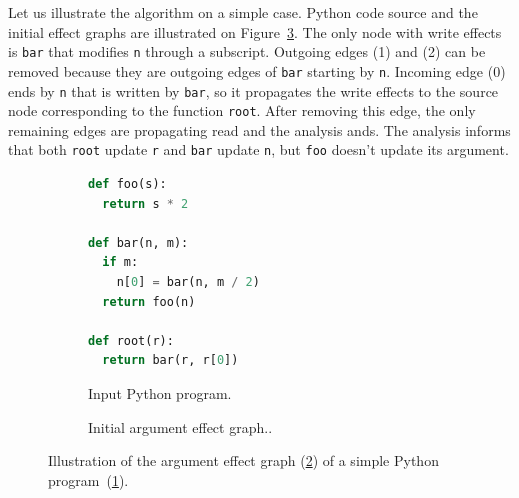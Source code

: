 \documentclass[10pt, preprint]{sigplanconf}
\begin{document}
Let us illustrate the algorithm on a simple case. Python code source and the
initial effect graphs are illustrated on Figure~\ref{fig:argument-effects}. The
only node with write effects is \texttt{bar} that modifies \texttt{n} through a
subscript. Outgoing edges (1) and (2) can be removed because they are
outgoing edges of \texttt{bar} starting by \texttt{n}. Incoming edge (0) ends
by \texttt{n} that is written by \texttt{bar}, so it propagates the write 
effects to the source node corresponding to the function \texttt{root}. After
removing this edge, the only remaining edges are propagating read and the 
analysis ands. The analysis informs that both \texttt{root} update \texttt{r} 
and \texttt{bar} update \texttt{n}, but \texttt{foo} doesn't update its 
argument.

\begin{figure}

    \begin{subfigure}{.5\textwidth}
        \begin{lstlisting}[language=python]
def foo(s):
  return s * 2

def bar(n, m):
  if m:
    n[0] = bar(n, m / 2)
  return foo(n)

def root(r):
  return bar(r, r[0])
        \end{lstlisting}
        \caption{Input Python program.}
        \label{fig:argument-effects-code}
    \end{subfigure}

    \begin{subfigure}{.5\textwidth}
        \centering
        \caption{Initial argument effect graph..}
        \label{fig:argument-effects-graph}
    \end{subfigure}

    \caption{Illustration of the argument effect graph (\ref{fig:argument-effects-graph}) of a simple Python program~(\ref{fig:argument-effects-code}).}
    \label{fig:argument-effects}

\end{figure}
\end{document}
